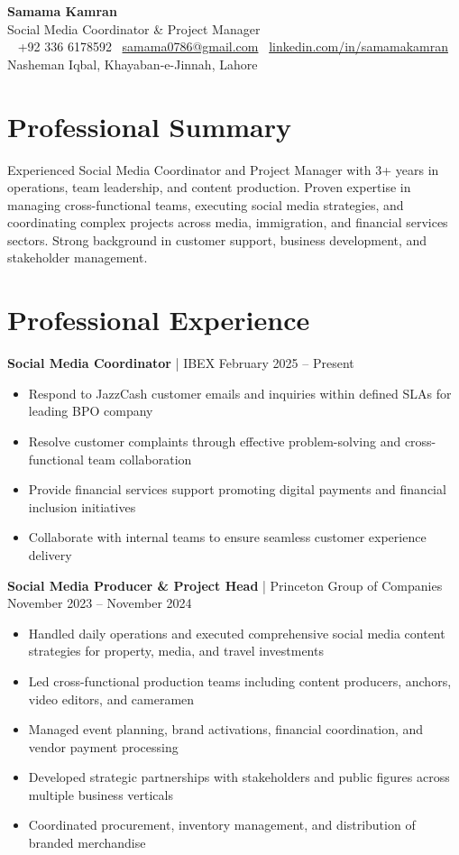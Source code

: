 \documentclass[10pt]{article}
\makeatletter
\newcommand{\headerfontsize}{\Large}
\newcommand{\bodyfontsize}{\small}
\newcommand{\resumeHeader}[1]{
    \begin{center}
        {\headerfontsize\bfseries\color{headercolor} Samama Kamran} \\[2pt]
        {\normalsize\color{headercolor} Social Media Coordinator \& Project Manager} \\[4pt]
        {\bodyfontsize\color{headercolor}
            \faPhone~ +92 336 6178592 \quad
            \faEnvelope~\href{mailto:samama0786@gmail.com}{samama0786@gmail.com} \quad
            \faLinkedin~\href{https://www.linkedin.com/in/samamakamran}{linkedin.com/in/samamakamran}
        } \\[3pt]
        {\bodyfontsize\color{headercolor} Nasheman Iqbal, Khayaban-e-Jinnah, Lahore}
        \vspace{6pt}
    \end{center}
}
\makeatother
\begin{document}
\pagestyle{empty}

\resumeHeader{}

\section{Professional Summary}
\bodyfontsize
Experienced Social Media Coordinator and Project Manager with 3+ years in operations, team leadership, and content production. Proven expertise in managing cross-functional teams, executing social media strategies, and coordinating complex projects across media, immigration, and financial services sectors. Strong background in customer support, business development, and stakeholder management.

\section{Professional Experience}

\textbf{Social Media Coordinator} | IBEX \hfill February 2025 -- Present
\begin{itemize}
\item Respond to JazzCash customer emails and inquiries within defined SLAs for leading BPO company
\item Resolve customer complaints through effective problem-solving and cross-functional team collaboration
\item Provide financial services support promoting digital payments and financial inclusion initiatives
\item Collaborate with internal teams to ensure seamless customer experience delivery
\end{itemize}
\textbf{Social Media Producer \& Project Head} | Princeton Group of Companies \hfill November 2023 – November 2024
\begin{itemize}
\item Handled daily operations and executed comprehensive social media content strategies for property, media, and travel investments
\item Led cross-functional production teams including content producers, anchors, video editors, and cameramen
\item Managed event planning, brand activations, financial coordination, and vendor payment processing
\item Developed strategic partnerships with stakeholders and public figures across multiple business verticals
\item Coordinated procurement, inventory management, and distribution of branded merchandise
\end{itemize}
\end{document}
